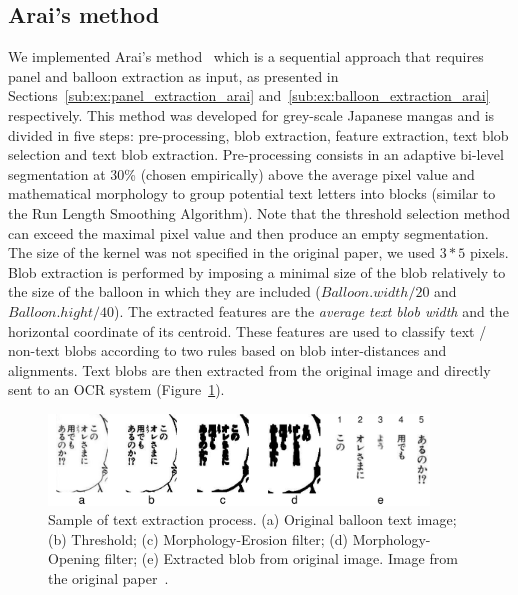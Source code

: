 

\subsection{Arai's method} %
We implemented Arai's method~\cite{Arai11} which is a sequential approach that requires panel and balloon extraction as input, as presented in Sections~\ref{sub:ex:panel_extraction_arai} and~\ref{sub:ex:balloon_extraction_arai} respectively.
This method was developed for grey-scale Japanese mangas and is divided in five steps: pre-processing, blob extraction, feature extraction, text blob selection and text blob extraction.
Pre-processing consists in an adaptive bi-level segmentation at 30\% (chosen empirically) above the average pixel value and mathematical morphology to group potential text letters into blocks (similar to the Run Length Smoothing Algorithm).
Note that the threshold selection method can exceed the maximal pixel value and then produce an empty segmentation.
The size of the kernel was not specified in the original paper, we used $3*5$ pixels.
Blob extraction is performed by imposing a minimal size of the blob relatively to the size of the balloon in which they are included ($Balloon.width / 20$ and $Balloon.hight / 40$).
The extracted features are the \emph{average text blob width} and the horizontal coordinate of its centroid.
These features are used to classify text / non-text blobs according to two rules based on blob inter-distances and alignments.
Text blobs are then extracted from the original image and directly sent to an OCR system (Figure~\ref{fig:ex:balloon_extraction_arai}).

\begin{figure}[h]
 \centering
 \includegraphics[width=0.9\textwidth]{balloon_extraction_arai.png}
 \caption[Sample of text extraction process of Arai's method]{Sample of text extraction process. (a) Original balloon text image; (b) Threshold; (c) Morphology-Erosion filter; (d) Morphology-Opening filter; (e) Extracted blob from original image. Image from the original paper~\cite{Arai11}.
 }
 \label{fig:ex:balloon_extraction_arai}
\end{figure}

